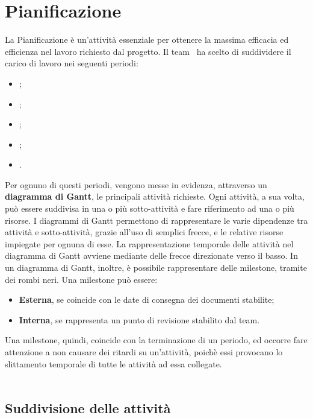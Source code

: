 \newpage

\section{Pianificazione}
La Pianificazione è un'attività essenziale per ottenere la massima efficacia ed efficienza nel lavoro richiesto dal progetto. Il team \gruppo\ ha scelto di suddividere il carico di lavoro nei seguenti periodi:
\begin{itemize}
	\item \textbf{\AR};
	\item \textbf{\PA};
	\item \textbf{\PD};
	\item \textbf{\CO};
	\item \textbf{\VV}.
\end{itemize}
Per ognuno di questi periodi, vengono messe in evidenza, attraverso un \textbf{diagramma di  Gantt}, le principali attività richieste. Ogni attività, a sua volta, può essere suddivisa in una o più sotto-attività e fare riferimento ad una o più risorse. I diagrammi di Gantt permettono di rappresentare le varie dipendenze tra attività e sotto-attività, grazie all’uso di semplici frecce, e le relative risorse impiegate per ognuna di esse. La rappresentazione temporale delle attività nel diagramma di Gantt avviene mediante delle frecce direzionate verso il basso. In un diagramma di Gantt, inoltre, è possibile rappresentare delle milestone, tramite dei rombi neri. Una milestone può essere:
\begin{itemize}
	\item \textbf{Esterna}, se coincide con le date di consegna dei documenti stabilite;
	\item \textbf{Interna}, se rappresenta un punto di revisione stabilito dal team.
\end{itemize}
Una milestone, quindi, coincide con la terminazione di un periodo, ed occorre fare attenzione a non causare dei ritardi su un'attività, poichè essi provocano lo slittamento temporale di tutte le attività ad essa collegate.
\\\\

	\subsection{Suddivisione delle attività}
